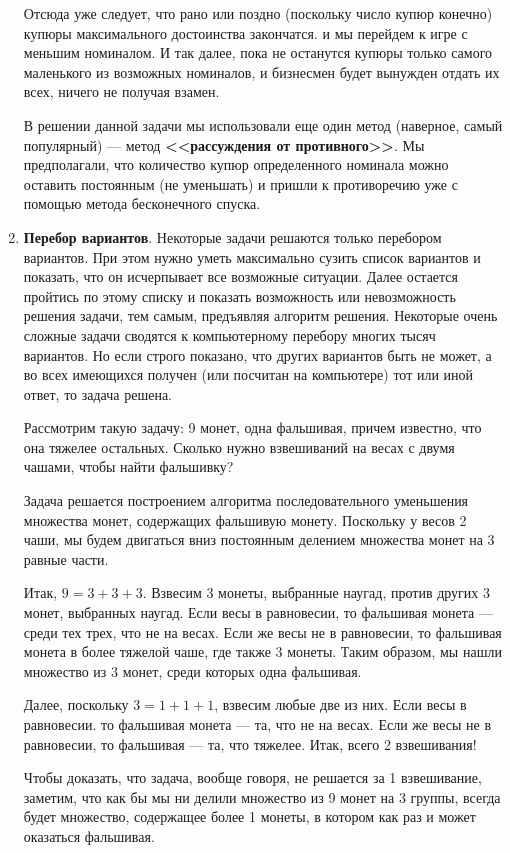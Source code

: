 \begin{enumerate}
Отсюда уже следует, что рано или поздно (поскольку число купюр конечно) купюры максимального достоинства закончатся. и мы перейдем к игре с меньшим номиналом. И так далее, пока не останутся купюры только самого маленького из возможных номиналов, и бизнесмен будет вынужден отдать их всех, ничего не получая взамен.

В решении данной задачи мы использовали еще один метод (наверное, самый популярный) --- метод \textbf{<<рассуждения от противного>>}. Мы предполагали, что количество купюр определенного номинала можно оставить постоянным (не уменьшать) и пришли к противоречию уже с помощью метода бесконечного спуска.

\item \textbf{Перебор вариантов}. Некоторые задачи решаются только перебором вариантов. При этом нужно уметь максимально сузить список вариантов и показать, что он исчерпывает все возможные ситуации. Далее остается пройтись по этому списку и показать возможность или невозможность решения задачи, тем самым, предъявляя алгоритм решения. Некоторые очень сложные задачи сводятся к компьютерному перебору многих тысяч вариантов. Но если строго показано, что других вариантов быть не может, а во всех имеющихся получен (или посчитан на компьютере) тот или иной ответ, то задача решена.

Рассмотрим такую задачу: 9 монет, одна фальшивая, причем известно, что она тяжелее остальных. Сколько нужно взвешиваний на весах с двумя чашами, чтобы найти фальшивку? 

Задача решается построением алгоритма последовательного уменьшения множества монет, содержащих фальшивую монету. Поскольку у весов 2 чаши, мы будем двигаться вниз постоянным делением множества монет на 3 равные части.

Итак, $9=3+3+3$. Взвесим 3 монеты, выбранные наугад, против других 3 монет, выбранных наугад. Если весы в равновесии, то фальшивая монета --- среди тех трех, что не на весах. Если же весы не в равновесии, то фальшивая монета в более тяжелой чаше, где также 3 монеты. Таким образом, мы нашли множество из 3 монет, среди которых одна фальшивая.

Далее, поскольку $3=1+1+1$, взвесим любые две из них. Если весы в равновесии. то фальшивая монета --- та, что не на весах. Если же весы не в равновесии, то фальшивая --- та, что тяжелее. Итак, всего 2 взвешивания!

Чтобы доказать, что задача, вообще говоря, не решается за 1 взвешивание, заметим, что как бы мы ни делили множество из 9 монет на 3 группы, всегда будет множество, содержащее более 1 монеты, в котором как раз и может оказаться фальшивая.


\end{enumerate}
